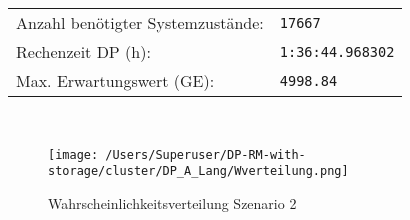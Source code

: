 \begin{table}[h!]
\begin{center}
\begin{tabular}{p{7cm}p{5cm}}
     Anzahl benötigter Systemzustände: & \texttt{17667} \\ 
     Rechenzeit DP (h): & \texttt{1:36:44.968302} \\ 
          Max. Erwartungswert (GE): & \texttt{4998.84} \\ \hline
         \end{tabular} \\[3mm]
  \end{center}
\end{table}

\begin{figure}[h!]
  \begin{center}
    \texttt{[image: /Users/Superuser/DP-RM-with-storage/cluster/DP\_A\_Lang/Wverteilung.png]}
    \caption{Wahrscheinlichkeitsverteilung Szenario 2}  \label{SB2}
  \end{center}
\end{figure}

